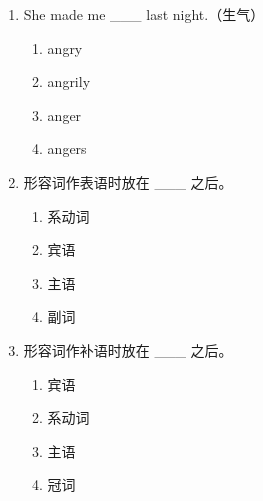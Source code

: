 \documentclass[11pt,a4paper]{ctexart}
\begin{document}
\begin{enumerate}[leftmargin=*,itemsep=4pt]
\begin{enumerate}[label=\Alph*.,leftmargin=2em,itemsep=1pt,topsep=2pt]
\item cleans
\end{enumerate}
\item She made me \_\_\_ last night.（生气）
\begin{enumerate}[label=\Alph*.,leftmargin=2em,itemsep=1pt,topsep=2pt]
\item angry
\item angrily
\item anger
\item angers
\end{enumerate}
\item 形容词作表语时放在 \_\_\_ 之后。
\begin{enumerate}[label=\Alph*.,leftmargin=2em,itemsep=1pt,topsep=2pt]
\item 系动词
\item 宾语
\item 主语
\item 副词
\end{enumerate}
\item 形容词作补语时放在 \_\_\_ 之后。
\begin{enumerate}[label=\Alph*.,leftmargin=2em,itemsep=1pt,topsep=2pt]
\item 宾语
\item 系动词
\item 主语
\item 冠词
\end{enumerate}
\end{enumerate}
\end{document}
